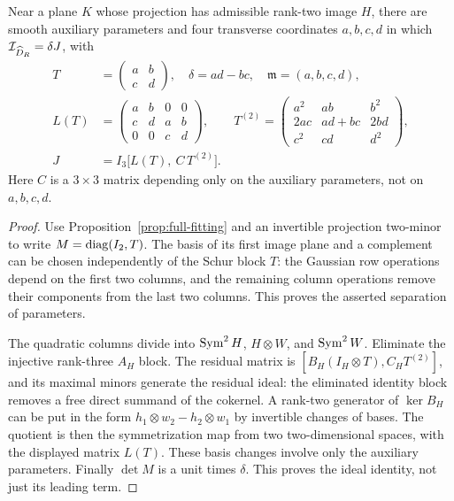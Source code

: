 \begin{lemma}\label{lem:residual-matrix}
Near a plane $K$ whose projection has admissible rank-two image $H$,
there are smooth auxiliary parameters and four transverse coordinates
$a,b,c,d$ in which $\mathcal I_{\widehat D_R}=\delta J$, with
\begin{equation}\label{eq:residual-matrix}
 \begin{split}
 T&=\begin{pmatrix}a&b\\c&d\end{pmatrix},\quad\delta=ad-bc,
 \quad\mathfrak m=(a,b,c,d),\\
 L(T)&=\begin{pmatrix}a&b&0&0\\c&d&a&b\\0&0&c&d\end{pmatrix},\qquad
 T^{(2)}=\begin{pmatrix}a^2&ab&b^2\\2ac&ad+bc&2bd\\c^2&cd&d^2\end{pmatrix},\\
 J&=I_3\bigl[L(T),\ C\,T^{(2)}\bigr].
 \end{split}
\end{equation}
Here $C$ is a $3\times3$ matrix depending only on the auxiliary
parameters, not on $a,b,c,d$.
\end{lemma}
\begin{proof}
Use Proposition~\ref{prop:full-fitting} and an invertible projection
two-minor to write $M=\operatorname{diag}(I_2,T)$. The basis of its first image
plane and a complement can be chosen independently of the Schur block
$T$: the Gaussian row operations depend on the first two columns, and
the remaining column operations remove their components from the last
two columns. This proves the asserted separation of parameters.

The quadratic columns divide into $\operatorname{Sym}^2H$, $H\otimes W$, and
$\operatorname{Sym}^2W$. Eliminate the injective rank-three $A_H$ block. The
residual matrix is $[B_H(I_H\otimes T),C_HT^{(2)}]$, and its maximal
minors generate the residual ideal: the eliminated identity block
removes a free direct summand of the cokernel. A rank-two generator
of $\ker B_H$ can be put in the form
$h_1\otimes w_2-h_2\otimes w_1$ by invertible changes of bases.
The quotient is then the symmetrization map from two two-dimensional
spaces, with the displayed matrix $L(T)$. These basis changes involve
only the auxiliary parameters. Finally $\det M$ is a unit times
$\delta$. This proves the ideal identity, not just its leading term.
\end{proof}

